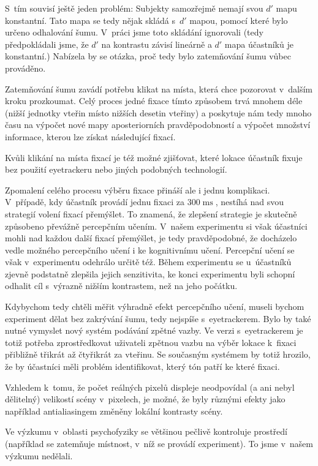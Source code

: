 S~tím souvisí ještě jeden problém: Subjekty samozřejmě nemají svou $d'$
mapu konstantní. Tato mapa se tedy nějak skládá s~$d'$ mapou, pomocí které
bylo určeno odhalování šumu. V~práci jsme toto skládání ignorovali (tedy
předpokládali jsme, že $d'$ na kontrastu závisí lineárně a $d'$ mapa účastníků
je konstantní.) Nabízela by se otázka, proč tedy bylo zatemňování šumu vůbec
prováděno.


Zatemňování šumu zavádí potřebu klikat na místa, která chce pozorovat
v~dalším kroku prozkoumat. Celý proces jedné fixace tímto způsobem trvá mnohem déle (nižší
jednotky vteřin místo nižších desetin vteřiny) a poskytuje nám tedy mnoho času
na výpočet nové mapy aposteriorních pravděpodobností a výpočet množství informace,
kterou lze získat následující fixací.

Kvůli klikání na místa fixací je též možné zjišťovat, které lokace účastník
fixuje bez použití eyetrackeru nebo jiných podobných technologií.

Zpomalení celého procesu výběru fixace přináší ale i jednu komplikaci. V~případě, kdy
účastník provádí jednu fixaci za $300\operatorname{ms}$, nestíhá nad svou
strategií volení fixací přemýšlet. To znamená, že zlepšení strategie je
skutečně způsobeno převážně percepčním učením. V~našem experimentu si však
účastníci mohli nad každou další fixací přemýšlet, je tedy pravděpodobné, že
docházelo vedle možného percepčního učení  i ke kognitivnímu učení. Percepční
učení se však v~experimentu odehrálo určitě též.  Během experimentu se u~účastníků zjevně podstatně zlepšila jejich senzitivita, ke konci experimentu
byli schopní odhalit cíl s~výrazně nižším kontrastem, než na jeho počátku.

Kdybychom tedy chtěli měřit výhradně efekt percepčního učení, museli bychom
experiment dělat bez zakrývání šumu, tedy nejspíše s~eyetrackerem. Bylo by
také nutné vymyslet nový systém podávání zpětné vazby. Ve verzi s~eyetrackerem je totiž
potřeba zprostředkovat uživateli zpětnou vazbu na výběr lokace k~fixaci přibližně třikrát až čtyřikrát 
za vteřinu. Se současným systémem
by totiž hrozilo, že by účastníci měli problém identifikovat, který tón patří ke které fixaci.

Vzhledem k~tomu, že počet reálných pixelů displeje neodpovídal (a ani
nebyl dělitelný) velikostí scény v~pixelech, je možné, že byly různými efekty jako
například antialiasingem změněny lokální kontrasty scény.

Ve výzkumu v~oblasti psychofyziky se většinou
pečlivě kontroluje prostředí (například se zatemňuje místnost, v~níž se provádí experiment). To jsme v~našem výzkumu nedělali.

